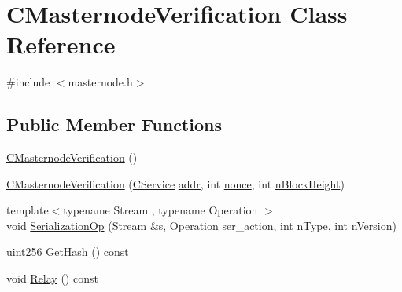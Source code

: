 \hypertarget{class_c_masternode_verification}{}\section{C\+Masternode\+Verification Class Reference}
\label{class_c_masternode_verification}


{\ttfamily \#include $<$masternode.\+h$>$}

\subsection*{Public Member Functions}
\begin{DoxyCompactItemize}
\item 
\mbox{\hyperlink{class_c_masternode_verification_ad1c2e6c5d86261eba390510e2f2ac172}{C\+Masternode\+Verification}} ()
\item 
\mbox{\hyperlink{class_c_masternode_verification_ad7aaee6df1709d52e61db04b1c5ccd55}{C\+Masternode\+Verification}} (\mbox{\hyperlink{class_c_service}{C\+Service}} \mbox{\hyperlink{class_c_masternode_verification_a3f59cf0f86faf879b98da2e40650c2c1}{addr}}, int \mbox{\hyperlink{class_c_masternode_verification_a68da56cfde3a649d9df4398584199713}{nonce}}, int \mbox{\hyperlink{class_c_masternode_verification_abcdce5525c4a618976ef33c01893eced}{n\+Block\+Height}})
\item 
{\footnotesize template$<$typename Stream , typename Operation $>$ }\\void \mbox{\hyperlink{class_c_masternode_verification_aee23a429aef05352bbbb24f12bb9d7bf}{Serialization\+Op}} (Stream \&s, Operation ser\+\_\+action, int n\+Type, int n\+Version)
\item 
\mbox{\hyperlink{classuint256}{uint256}} \mbox{\hyperlink{class_c_masternode_verification_a2e62468c0eef4cc0969657fc95d31fb3}{Get\+Hash}} () const
\item 
void \mbox{\hyperlink{class_c_masternode_verification_a66ce53bba99e770bdf47a5391a243c8c}{Relay}} () const
\end{DoxyCompactItemize}
